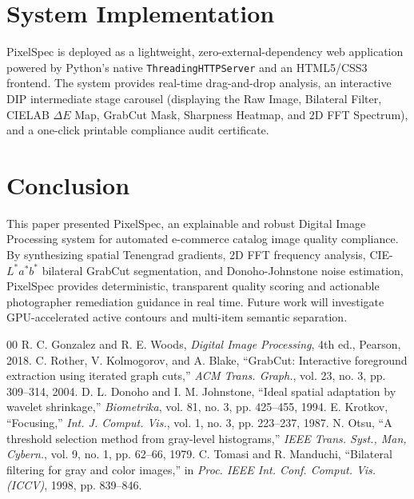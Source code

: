 \documentclass[conference]{IEEEtran}
\begin{document}
\section{System Implementation}
PixelSpec is deployed as a lightweight, zero-external-dependency web application powered by Python's native \texttt{ThreadingHTTPServer} and an HTML5/CSS3 frontend. The system provides real-time drag-and-drop analysis, an interactive DIP intermediate stage carousel (displaying the Raw Image, Bilateral Filter, CIELAB $\Delta E$ Map, GrabCut Mask, Sharpness Heatmap, and 2D FFT Spectrum), and a one-click printable compliance audit certificate.

\section{Conclusion}
This paper presented PixelSpec, an explainable and robust Digital Image Processing system for automated e-commerce catalog image quality compliance. By synthesizing spatial Tenengrad gradients, 2D FFT frequency analysis, CIE-$L^*a^*b^*$ bilateral GrabCut segmentation, and Donoho-Johnstone noise estimation, PixelSpec provides deterministic, transparent quality scoring and actionable photographer remediation guidance in real time. Future work will investigate GPU-accelerated active contours and multi-item semantic separation.

\begin{thebibliography}{00}
 R. C. Gonzalez and R. E. Woods, \textit{Digital Image Processing}, 4th ed., Pearson, 2018.
 C. Rother, V. Kolmogorov, and A. Blake, ``GrabCut: Interactive foreground extraction using iterated graph cuts,'' \textit{ACM Trans. Graph.}, vol. 23, no. 3, pp. 309--314, 2004.
 D. L. Donoho and I. M. Johnstone, ``Ideal spatial adaptation by wavelet shrinkage,'' \textit{Biometrika}, vol. 81, no. 3, pp. 425--455, 1994.
 E. Krotkov, ``Focusing,'' \textit{Int. J. Comput. Vis.}, vol. 1, no. 3, pp. 223--237, 1987.
 N. Otsu, ``A threshold selection method from gray-level histograms,'' \textit{IEEE Trans. Syst., Man, Cybern.}, vol. 9, no. 1, pp. 62--66, 1979.
 C. Tomasi and R. Manduchi, ``Bilateral filtering for gray and color images,'' in \textit{Proc. IEEE Int. Conf. Comput. Vis. (ICCV)}, 1998, pp. 839--846.
\end{thebibliography}
\end{document}
